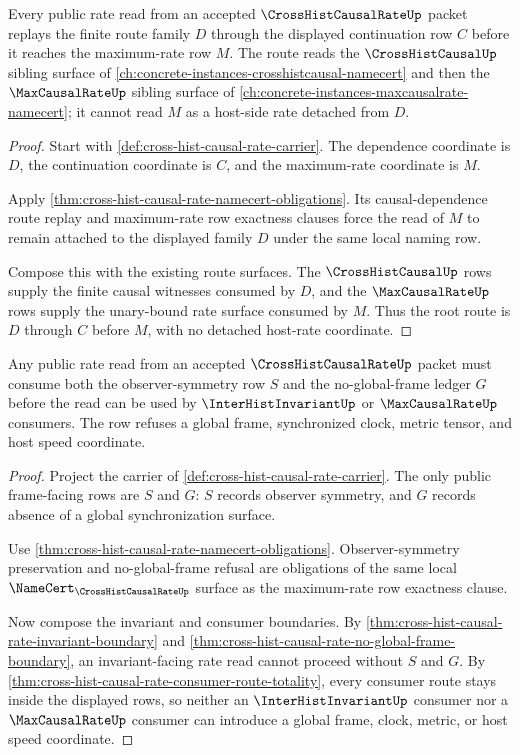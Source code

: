\begin{theorem}
\label{thm:cross-hist-causal-rate-obligation-route-replay}
Every public rate read from an accepted $\CrossHistCausalRateUp$ packet replays the finite route family $D$ through the displayed continuation row $C$ before it reaches the maximum-rate row $M$. The route reads the $\CrossHistCausalUp$ sibling surface of \autoref{ch:concrete-instances-crosshistcausal-namecert} and then the $\MaxCausalRateUp$ sibling surface of \autoref{ch:concrete-instances-maxcausalrate-namecert}; it cannot read $M$ as a host-side rate detached from $D$.
\end{theorem}
\begin{proof}
Start with \autoref{def:cross-hist-causal-rate-carrier}. The dependence coordinate is $D$, the continuation coordinate is $C$, and the maximum-rate coordinate is $M$.

Apply \autoref{thm:cross-hist-causal-rate-namecert-obligations}. Its causal-dependence route replay and maximum-rate row exactness clauses force the read of $M$ to remain attached to the displayed family $D$ under the same local naming row.

Compose this with the existing route surfaces. The $\CrossHistCausalUp$ rows supply the finite causal witnesses consumed by $D$, and the $\MaxCausalRateUp$ rows supply the unary-bound rate surface consumed by $M$. Thus the root route is $D$ through $C$ before $M$, with no detached host-rate coordinate.
\end{proof}

\begin{theorem}
\label{thm:cross-hist-causal-rate-obligation-frame-refusal}
Any public rate read from an accepted $\CrossHistCausalRateUp$ packet must consume both the observer-symmetry row $S$ and the no-global-frame ledger $G$ before the read can be used by $\InterHistInvariantUp$ or $\MaxCausalRateUp$ consumers. The row refuses a global frame, synchronized clock, metric tensor, and host speed coordinate.
\end{theorem}
\begin{proof}
Project the carrier of \autoref{def:cross-hist-causal-rate-carrier}. The only public frame-facing rows are $S$ and $G$: $S$ records observer symmetry, and $G$ records absence of a global synchronization surface.

Use \autoref{thm:cross-hist-causal-rate-namecert-obligations}. Observer-symmetry preservation and no-global-frame refusal are obligations of the same local $\NameCert_{\CrossHistCausalRateUp}$ surface as the maximum-rate row exactness clause.

Now compose the invariant and consumer boundaries. By \autoref{thm:cross-hist-causal-rate-invariant-boundary} and \autoref{thm:cross-hist-causal-rate-no-global-frame-boundary}, an invariant-facing rate read cannot proceed without $S$ and $G$. By \autoref{thm:cross-hist-causal-rate-consumer-route-totality}, every consumer route stays inside the displayed rows, so neither an $\InterHistInvariantUp$ consumer nor a $\MaxCausalRateUp$ consumer can introduce a global frame, clock, metric, or host speed coordinate.
\end{proof}


